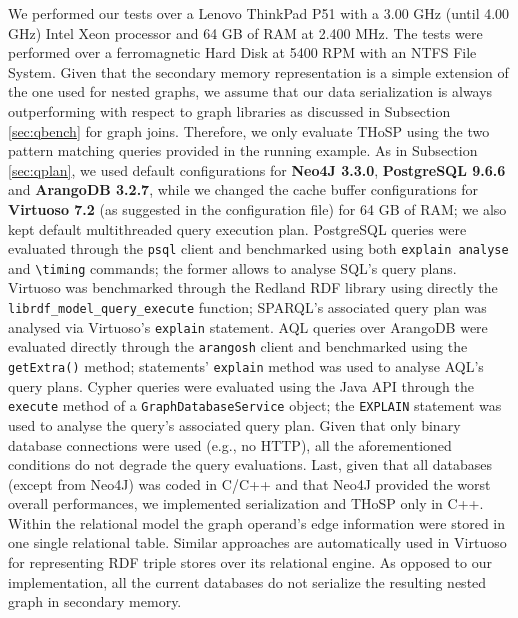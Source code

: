 We performed our tests over a Lenovo ThinkPad P51 with a 3.00 GHz (until 4.00 GHz) Intel Xeon processor and 64 GB of RAM at 2.400 MHz. The tests were performed over a ferromagnetic Hard Disk at 5400 RPM with an NTFS File System. Given that the secondary memory representation is a simple extension of the one used for nested graphs, we assume that our data serialization is always outperforming with respect to graph libraries as discussed in Subsection \vref{sec:qbench} for graph joins. Therefore, we only evaluate THoSP using the two pattern matching queries provided in the running example. As in Subsection \vref{sec:qplan}, we used default configurations for  \textbf{Neo4J 3.3.0}, \textbf{PostgreSQL 9.6.6} and \textbf{ArangoDB 3.2.7}, while we changed the cache buffer configurations for \textbf{Virtuoso 7.2} (as suggested in the configuration file) for 64 GB of RAM; we also kept  default multithreaded query execution plan.  PostgreSQL queries were evaluated through the \texttt{psql} client and benchmarked using both \texttt{explain analyse} and \texttt{\textbackslash timing} commands; the former   allows to analyse SQL's query plans. Virtuoso was benchmarked through the Redland RDF library using directly the \texttt{librdf\_model\_query\_execute} function; SPARQL's associated query plan was analysed via Virtuoso's \texttt{explain} statement.  
AQL queries over {ArangoDB} were evaluated directly through the \texttt{arangosh} client and benchmarked using the \texttt{getExtra()} method; statements' \texttt{explain} method was used to analyse AQL's query plans. Cypher queries were evaluated using the Java API through the \texttt{execute} method of a \texttt{GraphDatabaseService} object; the \texttt{EX\-PLAIN} statement was used to analyse the query's associated query plan. Given that only binary database connections were used (e.g., no HTTP),
all the aforementioned conditions do not degrade the query evaluations. Last, given that all databases (except from Neo4J) was coded in C/C++ and that Neo4J provided the worst overall performances, we implemented  serialization and THoSP only in C++.
Within the relational model the graph operand's edge information were  stored in one single relational table. Similar approaches are automatically used in Virtuoso for representing RDF triple stores over its relational engine. As opposed to our implementation, all the current databases do not serialize the resulting nested graph in secondary memory.






